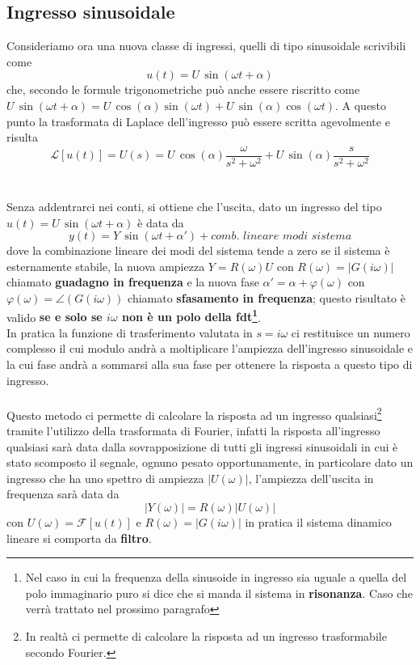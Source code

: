 \documentclass[a4paper]{article}
\begin{document}
	\subsection{Ingresso sinusoidale}
	Consideriamo ora una nuova classe di ingressi, quelli di tipo sinusoidale scrivibili come 
	\[u(t)=U\,\sin(\omega t+\alpha)\] che, secondo le formule trigonometriche può anche essere riscritto come $U\,\sin(\omega t+\alpha)=U\,\cos(\alpha)\sin(\omega t)+U\,\sin(\alpha)\cos(\omega t)$. A questo punto la trasformata di Laplace dell'ingresso può essere scritta agevolmente e risulta
	\[\mathcal{L}[u(t)]=U(s)=U\,\cos(\alpha)\dfrac{\omega}{s^2+\omega^2}+U\,\sin(\alpha)\dfrac{s}{s^2+\omega^2}\]
	\\\\Senza addentrarci nei conti, si ottiene che l'uscita, dato un ingresso del tipo $u(t)=U\,\sin(\omega t+\alpha)$ è data da
	\[y(t)=Y\,\sin(\omega t+\alpha')+ comb.\,\,lineare\,\,modi\,\,sistema\]
	dove la combinazione lineare dei modi del sistema tende a zero se il sistema è esternamente stabile, la nuova ampiezza $Y=R(\omega)U$ con $R(\omega)=|G(i\omega)|$ chiamato \textbf{guadagno in frequenza} e la nuova fase $\alpha'=\alpha+\varphi(\omega)$ con $\varphi(\omega)=\angle(G(i\omega))$ chiamato \textbf{sfasamento in frequenza}; questo risultato è valido \textbf{se e solo se $i\omega$ non è un polo della fdt\footnote{Nel caso in cui la frequenza della sinusoide in ingresso sia uguale a quella del polo immaginario puro si dice che si manda il sistema in \textbf{risonanza}. Caso che verrà trattato nel prossimo paragrafo}}.\\In pratica la funzione di trasferimento valutata in $s=i\omega$ ci restituisce un numero complesso il cui modulo andrà a moltiplicare l'ampiezza dell'ingresso sinusoidale e la cui fase andrà a sommarsi alla sua fase per ottenere la risposta a questo tipo di ingresso. 
	\\\\
	Questo metodo ci permette di calcolare la risposta ad un ingresso qualsiasi\footnote{In realtà ci permette di calcolare la risposta ad un ingresso trasformabile secondo Fourier.} tramite l'utilizzo della trasformata di Fourier, infatti la risposta all'ingresso qualsiasi sarà data dalla sovrapposizione di tutti gli ingressi sinusoidali in cui è stato scomposto il segnale, ognuno pesato opportunamente, in particolare dato un ingresso che ha uno spettro di ampiezza $|U(\omega)|$, l'ampiezza dell'uscita in frequenza sarà data da \[|Y(\omega)|=R(\omega)|U(\omega)|\] con $U(\omega)=\mathcal{F}[u(t)]$ e $R(\omega)=|G(i\omega)|$ in pratica il sistema dinamico lineare si comporta da \textbf{filtro}.
\end{document}
